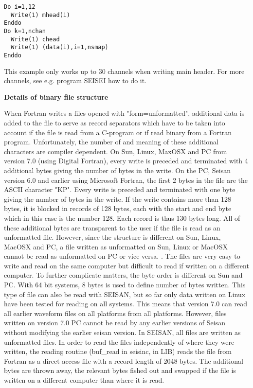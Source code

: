\begin{verbatim}
Do i=1,12
  Write(1) mhead(i)
Enddo
Do k=1,nchan
  Write(1) chead
  Write(1) (data(i),i=1,nsmap)
Enddo 
\end{verbatim}

This example only works up to 30 channels when writing main header. For more channels, see e.g. program SEISEI how to do it. 

\textbf{Details of binary file structure}

When Fortran writes a files opened with "form=unformatted", additional data is added to the file to serve as record separators which have to be taken into account if the file is read from a C-program or if read binary from a Fortran program. Unfortunately, the number of and meaning of these additional characters are compiler dependent. On Sun, Linux, MaxOSX and PC from version 7.0 (using Digital Fortran), every write is preceded and terminated with 4 additional bytes giving the number of bytes in the write. On the PC, Seisan version 6.0 and earlier using Microsoft Fortran, the first 2 bytes in the file are the ASCII character "KP". Every write is preceded and terminated with one byte giving the number of bytes in the write. If the write contains more than 128 bytes, it is blocked in records of 128 bytes, each with the start and end byte which in this case is the number 128. Each record is thus 130 bytes long. All of these additional bytes are transparent to the user if the file is read as an unformatted file. However, since the structure is different on Sun, Linux, MacOSX and PC, a file written as unformatted on Sun, Linux or MacOSX cannot be read as unformatted on PC or vice versa. . The files are very easy to write and read on the same computer but difficult to read if written on a different computer. To further complicate matters, the byte order is different on Sun and PC. With 64 bit systems, 8 bytes is used to define number of bytes written. This type of file can also be read with SEISAN, but so far only data written on Linux have been tested for reading on all systems.  
This means that version 7.0 can read all earlier waveform files on all platforms from all platforms. However, files written on version 7.0 PC cannot be read by any earlier versions of Seisan without modifying the earlier seisan version. 
In SEISAN, all files are written as unformatted files. In order to read the files independently of where they were written, the reading routine (buf\_read in seisinc, in LIB) reads the file from Fortran as a direct access file with a record length of 2048 bytes. The additional bytes are thrown away, the relevant bytes fished out and swapped if the file is written on a different computer than where it is read. 
